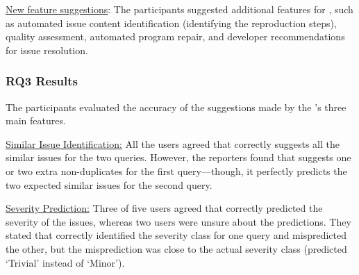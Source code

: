 \underline{New feature suggestions}: The participants suggested additional features for \toolname, such as automated issue content identification (\eg identifying the reproduction steps), quality assessment, automated program repair, and developer recommendations for issue resolution.

\subsubsection{RQ3 Results} 
The participants evaluated the accuracy of the suggestions made by the \toolname's three main features.

\underline{{Similar Issue Identification:}} All the users agreed that \toolname correctly suggests all the similar issues for the two queries. However, the reporters found that \toolname suggests one or two extra non-duplicates for the first query---though, it perfectly predicts the two expected similar issues for the second query.

\underline{{Severity Prediction:}} Three of five users agreed that \toolname correctly predicted the severity of the issues, whereas two users were unsure about the predictions. They stated that \toolname correctly identified the severity class for one query and mispredicted the other, but the misprediction was close to the actual severity class (\toolname predicted `Trivial' instead of `Minor').

